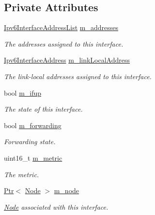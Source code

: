 \subsection*{Private Attributes}
\begin{DoxyCompactItemize}
\item 
\hyperlink{classns3_1_1Ipv6Interface_a8983603129d14da06c4bdeec91f1f9df}{Ipv6\+Interface\+Address\+List} \hyperlink{classns3_1_1Ipv6Interface_aa52ea13547366d30792b0edd3faf3979}{m\+\_\+addresses}
\begin{DoxyCompactList}\small\item\em The addresses assigned to this interface. \end{DoxyCompactList}\item 
\hyperlink{classns3_1_1Ipv6InterfaceAddress}{Ipv6\+Interface\+Address} \hyperlink{classns3_1_1Ipv6Interface_ab726d86b96feb17cf53c165d7062c4e2}{m\+\_\+link\+Local\+Address}
\begin{DoxyCompactList}\small\item\em The link-\/local addresses assigned to this interface. \end{DoxyCompactList}\item 
bool \hyperlink{classns3_1_1Ipv6Interface_a2073e2a90ea57f20b49562ccd917b713}{m\+\_\+ifup}
\begin{DoxyCompactList}\small\item\em The state of this interface. \end{DoxyCompactList}\item 
bool \hyperlink{classns3_1_1Ipv6Interface_a693503dceba1136651d29ef49c4bdff2}{m\+\_\+forwarding}
\begin{DoxyCompactList}\small\item\em Forwarding state. \end{DoxyCompactList}\item 
uint16\+\_\+t \hyperlink{classns3_1_1Ipv6Interface_a6a1ef3af8fb5f291c8f4bce8d8f19197}{m\+\_\+metric}
\begin{DoxyCompactList}\small\item\em The metric. \end{DoxyCompactList}\item 
\hyperlink{classns3_1_1Ptr}{Ptr}$<$ \hyperlink{classns3_1_1Node}{Node} $>$ \hyperlink{classns3_1_1Ipv6Interface_abc501f6da776acb53e65d8e657813d60}{m\+\_\+node}
\begin{DoxyCompactList}\small\item\em \hyperlink{classns3_1_1Node}{Node} associated with this interface. \end{DoxyCompactList}\item 

\end{DoxyCompactItemize}
